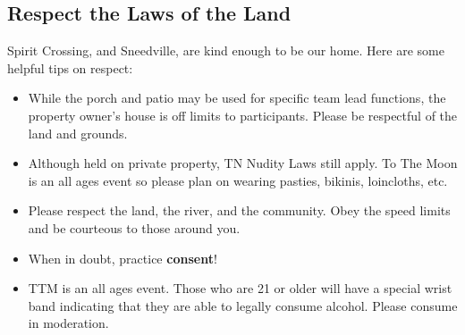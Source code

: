 \subsection*{Respect the Laws of the Land}
Spirit Crossing, and Sneedville, are kind enough to be our home.  Here are some helpful tips on respect:
\begin{itemize}[noitemsep]
\item While the porch and patio may be used for specific team lead functions, the property owner’s house is off limits to participants.  Please be respectful of the land and grounds.
\item Although held on private property, TN Nudity Laws still apply.  To The Moon is an all ages event so please plan on wearing pasties, bikinis, loincloths, etc.
\item Please respect the land, the river, and the community.  Obey the speed limits and be courteous to those around you.
\item When in doubt, practice \textbf{consent}!
\item TTM  is an all ages event.  Those who are 21 or older will have a special wrist band indicating that they are able to legally consume alcohol. Please consume in moderation.
\end{itemize}
    
